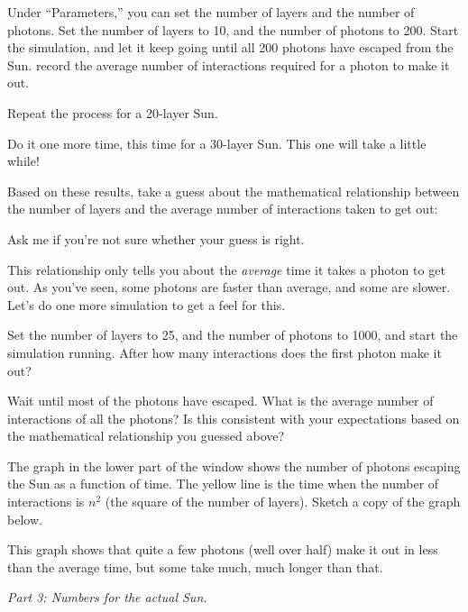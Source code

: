 Under ``Parameters,'' you can set the number of layers and the number of
photons. Set the number of layers to 10, and the number of photons to 200.
Start the simulation, and let it keep going until all 200 photons have escaped
from the Sun.
record
the average number of interactions required for a photon to make it out.

\answerspace{1in}


Repeat the process for a 20-layer Sun.  


\answerspace{1in}



Do it one more time, this time for a 30-layer Sun. This one will take
a little while!

\answerspace{1in}

Based on these results, take a guess about the mathematical relationship
between the number of layers and the average number of interactions
taken to get out:

\answerspace{1in}

Ask me if you're not sure whether your guess is right.

This relationship only tells you about the {\it average} time it takes
a photon to get out.  As you've seen,
some photons are faster than average, and some
are slower. Let's do one more simulation to get a feel for this.

Set the number of layers to 25, and the number of photons to 1000,
and start the simulation running.  After how many interactions
does the first photon make it out?

\answerspace{1in}

Wait until most of the photons have escaped.  What is the average number
of interactions of all the photons?  Is this consistent with your
expectations based on the mathematical relationship you guessed above?

\answerspace{1in}

The graph in the lower part of the window shows the number of photons
escaping the Sun as a function of time.  The yellow line is the time
when the number of interactions is $n^2$ (the square of the
number of layers).  Sketch a copy of the graph below.

\answerspace{1in}

This graph shows that quite a few photons (well over half) make it out
in less than the average time, but some take much, much longer than that.

\medskip

{\it Part 3: Numbers for the actual Sun.}

